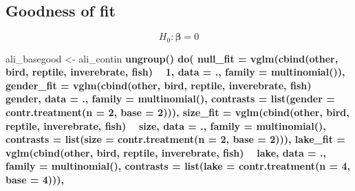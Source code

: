 \documentclass[]{book}
\newenvironment{Shaded}{\begin{snugshade}}{\end{snugshade}}
\newcommand{\DataTypeTok}[1]{\textcolor[rgb]{0.13,0.29,0.53}{#1}}
\newcommand{\DecValTok}[1]{\textcolor[rgb]{0.00,0.00,0.81}{#1}}
\newcommand{\KeywordTok}[1]{\textcolor[rgb]{0.13,0.29,0.53}{\textbf{#1}}}
\newcommand{\NormalTok}[1]{#1}
\newcommand{\OperatorTok}[1]{\textcolor[rgb]{0.81,0.36,0.00}{\textbf{#1}}}
\newcommand{\StringTok}[1]{\textcolor[rgb]{0.31,0.60,0.02}{#1}}
\begin{document}
\hypertarget{goodness-of-fit-2}{%
\subsection{Goodness of fit}\label{goodness-of-fit-2}}

\[H_0: \boldsymbol\beta = 0\]

\begin{Shaded}
\begin{Highlighting}[]
\NormalTok{ali_basegood <-}
\StringTok{  }\NormalTok{ali_contin }\OperatorTok{%
\StringTok{  }\KeywordTok{ungroup}\NormalTok{() }\OperatorTok{%
\StringTok{  }\KeywordTok{do}\NormalTok{(}
    \DataTypeTok{null_fit =} \KeywordTok{vglm}\NormalTok{(}\KeywordTok{cbind}\NormalTok{(other, bird, reptile, inverebrate, fish) }\OperatorTok{~}\StringTok{ }\DecValTok{1}\NormalTok{, }
                    \DataTypeTok{data =}\NormalTok{ ., }\DataTypeTok{family =} \KeywordTok{multinomial}\NormalTok{()),}
    \DataTypeTok{gender_fit =} \KeywordTok{vglm}\NormalTok{(}\KeywordTok{cbind}\NormalTok{(other, bird, reptile, inverebrate, fish) }\OperatorTok{~}\StringTok{ }\NormalTok{gender, }
                    \DataTypeTok{data =}\NormalTok{ ., }\DataTypeTok{family =} \KeywordTok{multinomial}\NormalTok{(),}
                    \DataTypeTok{contrasts =} \KeywordTok{list}\NormalTok{(}\DataTypeTok{gender =} \KeywordTok{contr.treatment}\NormalTok{(}\DataTypeTok{n =} \DecValTok{2}\NormalTok{, }\DataTypeTok{base =} \DecValTok{2}\NormalTok{))),}
    \DataTypeTok{size_fit =} \KeywordTok{vglm}\NormalTok{(}\KeywordTok{cbind}\NormalTok{(other, bird, reptile, inverebrate, fish) }\OperatorTok{~}\StringTok{ }\NormalTok{size, }
                    \DataTypeTok{data =}\NormalTok{ ., }\DataTypeTok{family =} \KeywordTok{multinomial}\NormalTok{(),}
                    \DataTypeTok{contrasts =} \KeywordTok{list}\NormalTok{(}\DataTypeTok{size =} \KeywordTok{contr.treatment}\NormalTok{(}\DataTypeTok{n =} \DecValTok{2}\NormalTok{, }\DataTypeTok{base =} \DecValTok{2}\NormalTok{))),}
    \DataTypeTok{lake_fit =} \KeywordTok{vglm}\NormalTok{(}\KeywordTok{cbind}\NormalTok{(other, bird, reptile, inverebrate, fish) }\OperatorTok{~}\StringTok{ }\NormalTok{lake, }
                    \DataTypeTok{data =}\NormalTok{ ., }\DataTypeTok{family =} \KeywordTok{multinomial}\NormalTok{(),}
                    \DataTypeTok{contrasts =} \KeywordTok{list}\NormalTok{(}\DataTypeTok{lake =} \KeywordTok{contr.treatment}\NormalTok{(}\DataTypeTok{n =} \DecValTok{4}\NormalTok{, }\DataTypeTok{base =} \DecValTok{4}\NormalTok{))),}
}}
\end{Highlighting}
\end{Shaded}
\end{document}
